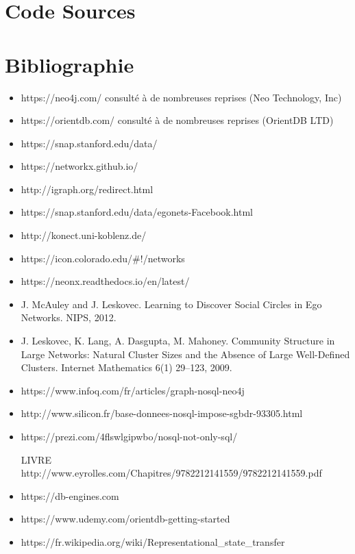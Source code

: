 \documentclass[a4paper,fleqn,12pt]{report}
\begin{document}
\chapter*{Code Sources}



\chapter*{Bibliographie}
\begin{itemize}
\item https://neo4j.com/ consulté à de nombreuses reprises (Neo Technology, Inc)
\item https://orientdb.com/ consulté à de nombreuses reprises (OrientDB LTD)
\item https://snap.stanford.edu/data/
\item https://networkx.github.io/
\item http://igraph.org/redirect.html
\item https://snap.stanford.edu/data/egonets-Facebook.html
\item http://konect.uni-koblenz.de/
\item https://icon.colorado.edu/\#!/networks
\item https://neonx.readthedocs.io/en/latest/
\item J. McAuley and J. Leskovec. Learning to Discover Social Circles in Ego Networks. NIPS, 2012.
\item J. Leskovec, K. Lang, A. Dasgupta, M. Mahoney. Community Structure in Large Networks: Natural Cluster Sizes and the Absence of Large Well-Defined Clusters. Internet Mathematics 6(1) 29--123, 2009.
\item https://www.infoq.com/fr/articles/graph-nosql-neo4j
\item http://www.silicon.fr/base-donnees-nosql-impose-sgbdr-93305.html
\item https://prezi.com/4flswlgipwbo/nosql-not-only-sql/
\item [LIVRE] http://www.eyrolles.com/Chapitres/9782212141559/9782212141559.pdf
\item https://db-engines.com
\item https://www.udemy.com/orientdb-getting-started
\item https://fr.wikipedia.org/wiki/Representational\_state\_transfer
\end{itemize}
\end{document}
